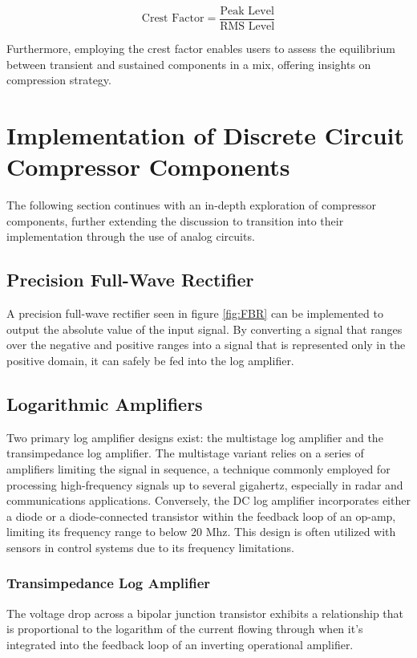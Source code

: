 \documentclass[10pt]{article}
\begin{document}
\begin{multicols*}{2}
                    \begin{equation}
                        \text{Crest Factor} = \frac{\text{Peak Level}}{\text{RMS Level}}
                    \end{equation}

                \noindent Furthermore, employing the crest factor enables users to assess the equilibrium between transient and sustained components in a mix, offering insights on compression strategy.                
            
        \section{Implementation of Discrete Circuit Compressor Components}
            The following section continues with an in-depth exploration of compressor components, further extending the discussion to transition into their implementation through the use of analog circuits.

            \subsection{Precision Full-Wave Rectifier}
                A precision full-wave rectifier seen in figure \ref{fig:FBR} can be implemented to output the absolute value of the input signal. By converting a signal that ranges over the negative and positive ranges into a signal that is represented only in the positive domain, it can safely be fed into the log amplifier.
                
            \subsection{Logarithmic Amplifiers} \label{sect:log-amp}
                Two primary log amplifier designs exist: the multistage log amplifier and the transimpedance log amplifier. The multistage variant relies on a series of amplifiers limiting the signal in sequence, a technique commonly employed for processing high-frequency signals up to several gigahertz, especially in radar and communications applications. Conversely, the DC log amplifier incorporates either a diode or a diode-connected transistor within the feedback loop of an op-amp, limiting its frequency range to below 20 Mhz. This design is often utilized with sensors in control systems due to its frequency limitations.\par

                \subsubsection{Transimpedance Log Amplifier}
                    The voltage drop across a bipolar junction transistor exhibits a relationship that is proportional to the logarithm of the current flowing through when it's integrated into the feedback loop of an inverting operational amplifier. 
                    

\end{multicols*}
\end{document}
